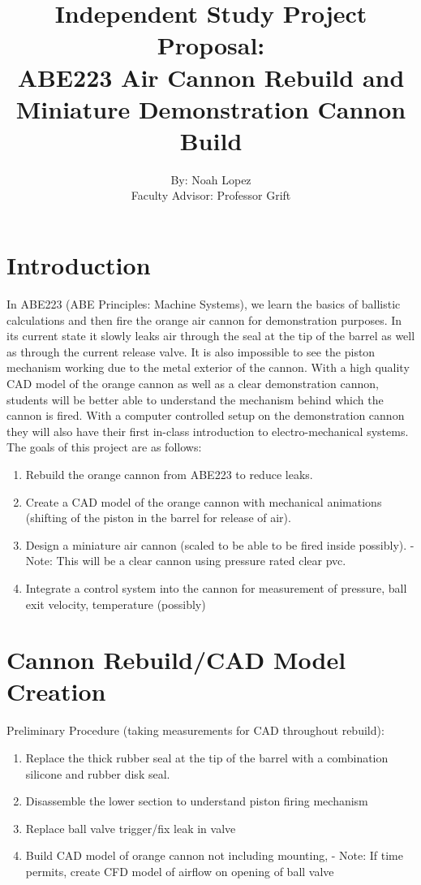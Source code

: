 \documentclass[11pt,letterpaper]{scrartcl}
\title{\vspace{-2.5cm} Independent Study Project Proposal: \\
	ABE223 Air Cannon Rebuild and Miniature Demonstration Cannon Build}
\author{By: Noah Lopez \\
	Faculty Advisor: Professor Grift}
\begin{document}
	\maketitle
	
	\section{Introduction}
	In ABE223 (ABE Principles: Machine Systems), we learn the basics of ballistic calculations and then fire the orange air cannon for demonstration purposes. In its current state it slowly leaks air through the seal at the tip of the barrel as well as through the current release valve. It is also impossible to see the piston mechanism working due to the metal exterior of the cannon. With a high quality CAD model of the orange cannon as well as a clear demonstration cannon, students will be better able to understand the mechanism behind which the cannon is fired. With a computer controlled setup on the demonstration cannon they will also have their first in-class introduction to electro-mechanical systems.\\

	The goals of this project are as follows:
	\begin{enumerate}
	\item Rebuild the orange cannon from ABE223 to reduce leaks.
	\item Create a CAD model of the orange cannon with mechanical animations (shifting of the piston in the barrel for release of air).
	\item Design a miniature air cannon (scaled to be able to be fired inside possibly).
	\subitem - Note: This will be a clear cannon using pressure rated clear pvc.
	\item Integrate a control system into the cannon for measurement of pressure, ball exit velocity, temperature (possibly)
	\end{enumerate}
	
	\section{Cannon Rebuild/CAD Model Creation}
	Preliminary Procedure (taking measurements for CAD throughout rebuild):
	\begin{enumerate}
	\item Replace the thick rubber seal at the tip of the barrel with a combination silicone and rubber disk seal.
	\item Disassemble the lower section to understand piston firing mechanism
	\item Replace ball valve trigger/fix leak in valve
	\item Build CAD model of orange cannon not including mounting, 
	\subitem - Note: If time permits, create CFD model of airflow on opening of ball valve
	\end{enumerate}
	
\end{document}
